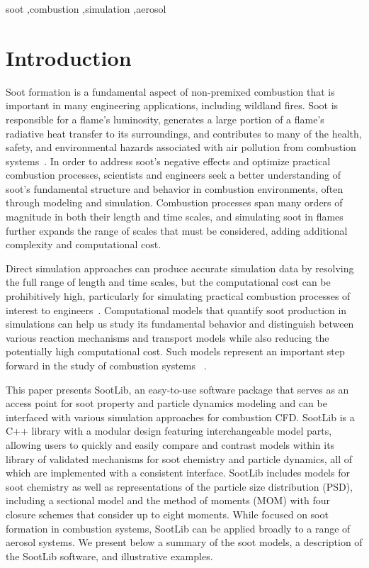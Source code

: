 \documentclass[preprint,letterpaper]{elsarticle}
\begin{document}
\begin{frontmatter}
\begin{keyword}
soot \sep combustion \sep simulation \sep aerosol
\end{keyword}

\end{frontmatter}

\linenumbers


\section{Introduction}
\label{s:intro}

Soot formation is a fundamental aspect of non-premixed combustion that is important in many engineering applications, including wildland fires. Soot is responsible for a flame's luminosity, generates a large portion of a flame's radiative heat transfer to its surroundings, and contributes to many of the health, safety, and environmental hazards associated with air pollution from combustion systems~\cite{EPA_2009,EPA_2004}. In order to address soot's negative effects and optimize practical combustion processes, scientists and engineers seek a better understanding of soot's fundamental structure and behavior in combustion environments, often through modeling and simulation.
Combustion processes span many orders of magnitude in both their length and time scales, and simulating soot in flames further expands the range of scales that must be considered, adding additional complexity and computational cost.

Direct simulation approaches can produce accurate simulation data by resolving the full range of length and time scales, but the computational cost can be prohibitively high, particularly for simulating practical combustion processes of interest to engineers~\cite{Pope_2000}.
Computational models that quantify soot production in simulations can help us study its fundamental behavior and distinguish between various reaction mechanisms and transport models while also reducing the potentially high computational cost. Such models represent an important step forward in the study of combustion systems ~\cite{Frenklach_2002b}.

This paper presents SootLib, an easy-to-use software package that serves as an access point for soot property and particle dynamics modeling and can be interfaced with various simulation approaches for combustion CFD.
SootLib is a C++ library with a modular design featuring interchangeable model parts, allowing users to quickly and easily compare and contrast models within its library of validated mechanisms for soot chemistry and particle dynamics, all of which are implemented with a consistent interface.
SootLib includes models for soot chemistry as well as representations of the particle size distribution (PSD), including a sectional model and the method of moments (MOM) with four closure schemes that consider up to eight moments.
While focused on soot formation in combustion systems, SootLib can be applied broadly to a range of aerosol systems.
We present below a summary of the soot models, a description of the SootLib software, and illustrative examples.
\end{document}
